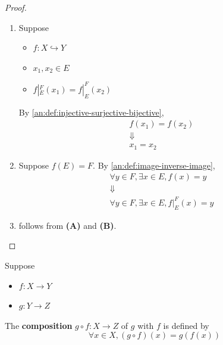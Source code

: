 \begin{proof}
  \leavevmode\par
  \begin{enumerate}[label=\textbf{(\Alph*)}]
    \item Suppose
          \begin{itemize}
            \item $f: X \hookrightarrow Y$
            \item $x_{1}, x_{2} \in E$
            \item  $f|_{E}^{F}(x_{1}) = f|_{E}^{F}(x_{2})$
          \end{itemize}
          By \cref{an:def:injective-surjective-bijective},
          \[
            \begin{array}{c}
              f(x_{1}) = f(x_{2}) \\
              \Downarrow          \\
              x_{1} = x_{2}
            \end{array}
          \]
    \item Suppose $f(E) = F$. By \cref{an:def:image-inverse-image},
          \[
            \begin{array}{c}
              \forall y \in F, \exists x \in E, f(x) = y \\
              \Downarrow                                 \\
              \forall y \in F, \exists x \in E, f|_{E}^{F}(x) = y
            \end{array}
          \]
    \item follows from \textbf{(A)} and \textbf{(B)}.
  \end{enumerate}
\end{proof}

\bigskip

\begin{definition} \label{an:def:composition-function}
  Suppose
  \begin{itemize}
    \item $f: X \to Y$
    \item $g: Y \to Z$
  \end{itemize}
  The \textbf{composition} $g \circ f: X \to Z$ of $g$ with $f$ is defined by
  \[
    \forall x \in X, (g \circ f)(x) = g(f(x))
  \]
\end{definition}

\bigskip

